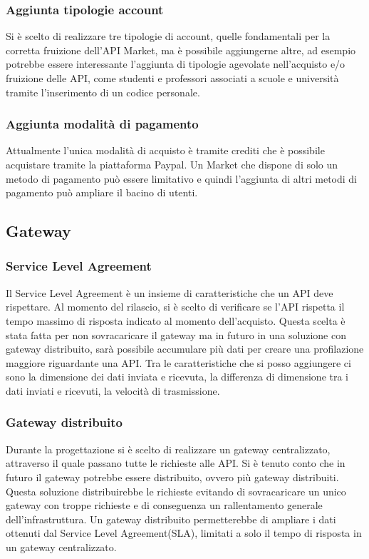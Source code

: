 \subsubsection{Aggiunta tipologie account}
Si è scelto di realizzare tre tipologie di account, quelle fondamentali per la corretta fruizione dell'API Market, ma è possibile aggiungerne altre, ad esempio potrebbe essere interessante l'aggiunta di tipologie agevolate nell'acquisto e/o fruizione delle API, come studenti e professori associati a scuole e università tramite l'inserimento di un codice personale.


\subsubsection{Aggiunta modalità di pagamento}
Attualmente l'unica modalità di acquisto è tramite crediti che è possibile acquistare tramite la piattaforma Paypal. Un Market che dispone di solo un metodo di pagamento può essere limitativo e quindi l'aggiunta di altri metodi di pagamento può ampliare il bacino di utenti.

\subsection{Gateway}

\subsubsection{Service Level Agreement}
Il Service Level Agreement è un insieme di caratteristiche che un API deve rispettare. Al momento del rilascio, si è scelto di verificare se l'API rispetta il tempo massimo di risposta indicato al momento dell'acquisto. Questa scelta è stata fatta per non sovracaricare il gateway ma in futuro in una soluzione con gateway distribuito, sarà possibile accumulare più dati per creare una profilazione maggiore riguardante una API. Tra le caratteristiche che si posso aggiungere ci sono la dimensione dei dati inviata e ricevuta, la differenza di dimensione tra i dati inviati e ricevuti, la velocità di trasmissione.

\subsubsection{Gateway distribuito}
Durante la progettazione si è scelto di realizzare un gateway centralizzato, attraverso il quale passano tutte le richieste alle API. Si è tenuto conto che in futuro il gateway potrebbe essere distribuito, ovvero più gateway distribuiti. Questa soluzione distribuirebbe le richieste evitando di sovracaricare un unico gateway con troppe richieste e di conseguenza un rallentamento generale dell'infrastruttura. Un gateway distribuito permetterebbe di ampliare i dati ottenuti dal Service Level Agreement(SLA), limitati a solo il tempo di risposta in un gateway centralizzato.


